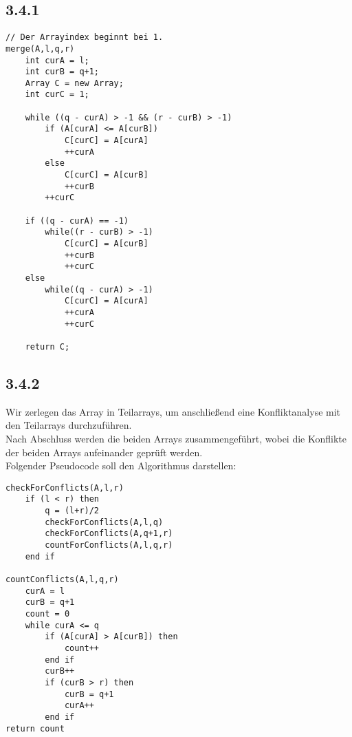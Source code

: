 \subsection*{3.4.1}
\begin{verbatim}
// Der Arrayindex beginnt bei 1.
merge(A,l,q,r)
    int curA = l;
    int curB = q+1;
    Array C = new Array;
    int curC = 1;

    while ((q - curA) > -1 && (r - curB) > -1)
        if (A[curA] <= A[curB])
            C[curC] = A[curA]
            ++curA
        else
            C[curC] = A[curB]
            ++curB
        ++curC

    if ((q - curA) == -1)
        while((r - curB) > -1)
            C[curC] = A[curB]
            ++curB
            ++curC
    else
        while((q - curA) > -1)
            C[curC] = A[curA]
            ++curA
            ++curC

    return C;
\end{verbatim}

\subsection*{3.4.2}
Wir zerlegen das Array in Teilarrays, um anschließend eine Konfliktanalyse mit den Teilarrays durchzuführen.\\
Nach Abschluss werden die beiden Arrays zusammengeführt, wobei die Konflikte der beiden Arrays aufeinander geprüft werden.\\
Folgender Pseudocode soll den Algorithmus darstellen:
\begin{verbatim}
checkForConflicts(A,l,r)
    if (l < r) then
        q = (l+r)/2
        checkForConflicts(A,l,q)
        checkForConflicts(A,q+1,r)
        countForConflicts(A,l,q,r)
    end if

countConflicts(A,l,q,r)
    curA = l
    curB = q+1
    count = 0
    while curA <= q
        if (A[curA] > A[curB]) then
            count++
        end if
        curB++
        if (curB > r) then
            curB = q+1
            curA++
        end if
return count
\end{verbatim}